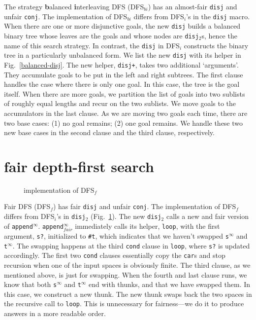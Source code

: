 \documentclass[acmlarge, review=true]{acmart}
\newcommand{\conj}{\texttt{conj}}
\newcommand{\disj}{\texttt{disj}}
\newcommand{\disjtwo}{\texttt{disj$_2$}}
\newcommand{\appendInf}{\texttt{append$^\infty$}}
\newcommand{\appendInfFair}{\texttt{append$^\infty_{fair}$}}
\newcommand{\sInf}{\texttt{s$^\infty$}}
\newcommand{\tInf}{\texttt{t$^\infty$}}
\newcommand{\DFSi }[0]{DFS$_{i}$}
\newcommand{\DFSf }[0]{DFS$_{f}$}
\newcommand{\DFSbi}[0]{DFS$_{bi}$}
\begin{document}
The strategy \textbf{b}alanced \textbf{i}nterleaving DFS (\DFSbi{}) has an 
almost-fair \disj{} and unfair 
\conj{}. The implementation of \DFSbi{} differs from 
\DFSi{}'s in the \disj{} macro. When there are one or more disjunctive 
goals, the new \disj{} builds a balanced binary tree whose leaves are the goals 
and 
whose nodes are \disjtwo{}s, hence the name of this search strategy. 
In contrast, the \disj{} in \DFSi{} constructs the binary tree in a 
particularly unbalanced form.
We list the new \disj{} with its helper in Fig.~\ref{balanced-disj}.
The new helper, \texttt{disj+}, takes two additional `arguments'. They 
accumulate goals to be put in the left and right subtrees. The first clause 
handles the case where there is only one goal. In this case, the tree is the 
goal itself. When there are more goals, we partition the list of goals 
into two sublists of roughly equal lengths and recur on the two sublists. We 
move goals to the accumulators in the last clause. As we are moving 
two goals each time, there are two base cases: (1) no goal remains; (2) one 
goal remains. We handle these two new base cases in the second clause and the 
third clause, respectively. 

\section{fair depth-first search}

\begin{figure}
	
	\caption{implementation of \DFSf{}}
	\label{fDFS}
\end{figure}

Fair DFS (\DFSf) has fair \disj{} and unfair \conj{}. The 
implementation of \DFSf{} differs from \DFSi{}'s in 
\disjtwo{} (Fig.~\ref{fDFS}). The new \disjtwo{} calls a new and 
fair version of \appendInf{}. \appendInfFair{} 
immediately 
calls 
its helper, \texttt{loop}, with the first argument, \texttt{s?}, initialized to 
\texttt{\#{}t}, which indicates that we haven't swapped
\sInf{} and \tInf{}. The swapping 
happens at 
the third \texttt{cond} clause in \texttt{loop}, where \texttt{s?} is updated 
accordingly. The first two \texttt{cond} clauses essentially copy the 
\texttt{car}s and stop recursion when one of the input spaces is obviously 
finite. The third clause, as we mentioned above, is just for swapping. When the 
fourth and last clause runs, we know that both \sInf{} and 
\tInf{} end with thunks, and that we have swapped them. In 
this case, we construct a new thunk. The new thunk swaps back the two spaces in 
the
recursive call to \texttt{loop}. This is unnecessary for fairness---we do it to 
produce answers in a more readable order.
\end{document}
